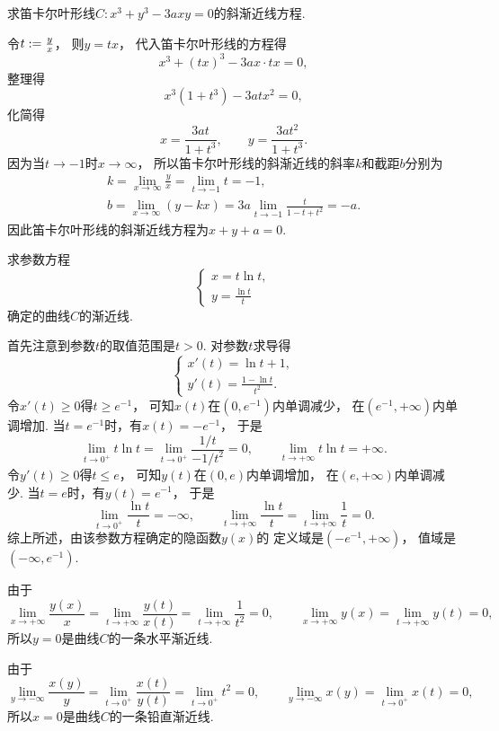 \begin{example}
求笛卡尔叶形线\(C: x^3+y^3-3axy=0\)的斜渐近线方程.
\begin{solution}
令\(t := \frac{y}{x}\)，
则\(y = tx\)，
代入笛卡尔叶形线的方程得\[
	x^3+(tx)^3-3ax \cdot tx = 0,
\]
整理得\[
	x^3(1+t^3)-3atx^2=0,
\]
化简得\[
	x = \frac{3at}{1+t^3},
	\qquad
	y = \frac{3at^2}{1+t^3}.
\]
因为当\(t\to-1\)时\(x\to\infty\)，
所以笛卡尔叶形线的斜渐近线的斜率\(k\)和截距\(b\)分别为\begin{gather*}
	k = \lim_{x\to\infty} \frac{y}{x}
	= \lim_{t\to-1} t
	= -1, \\
	b = \lim_{x\to\infty} (y-kx)
	= 3a \lim_{t\to-1} \frac{t}{1-t+t^2}
	= -a.
\end{gather*}
因此笛卡尔叶形线的斜渐近线方程为\(x+y+a=0\).
\end{solution}
\end{example}

\begin{example}
求参数方程\[
	\left\{ \begin{array}{l}
		x = t \ln t, \\
		y = \frac{\ln t}t
	\end{array} \right.
\]确定的曲线\(C\)的渐近线.
\begin{solution}
首先注意到参数\(t\)的取值范围是\(t>0\).
对参数\(t\)求导得\[
	\left\{ \begin{array}{l}
		x'(t) = \ln t + 1, \\
		y'(t) = \frac{1-\ln t}{t^2}.
	\end{array} \right.
\]
令\(x'(t) \geq 0\)得\(t \geq e^{-1}\)，
可知\(x(t)\)在\((0,e^{-1})\)内单调减少，
在\((e^{-1},+\infty)\)内单调增加.
当\(t = e^{-1}\)时，有\(x(t) = -e^{-1}\)，
于是\[
	\lim_{t\to0^+} t \ln t
	= \lim_{t\to0^+} \frac{1/t}{-1/t^2}
	= 0,
	\qquad
	\lim_{t\to+\infty} t \ln t
	= +\infty.
\]
令\(y'(t) \geq 0\)得\(t \leq e\)，
可知\(y(t)\)在\((0,e)\)内单调增加，
在\((e,+\infty)\)内单调减少.
当\(t = e\)时，有\(y(t) = e^{-1}\)，
于是\[
	\lim_{t\to0^+} \frac{\ln t}{t}
	= -\infty,
	\qquad
	\lim_{t\to+\infty} \frac{\ln t}{t}
	= \lim_{t\to+\infty} \frac1t
	= 0.
\]
综上所述，由该参数方程确定的隐函数\(y(x)\)的
定义域是\((-e^{-1},+\infty)\)，
值域是\((-\infty,e^{-1})\).

由于\[
	\lim_{x\to+\infty} \frac{y(x)}{x}
	= \lim_{t\to+\infty} \frac{y(t)}{x(t)}
	= \lim_{t\to+\infty} \frac1{t^2}
	= 0,
	\qquad
	\lim_{x\to+\infty} y(x)
	= \lim_{t\to+\infty} y(t)
	= 0,
\]
所以\(y=0\)是曲线\(C\)的一条水平渐近线.

由于\[
	\lim_{y\to-\infty} \frac{x(y)}{y}
	= \lim_{t\to0^+} \frac{x(t)}{y(t)}
	= \lim_{t\to0^+} t^2
	= 0,
	\qquad
	\lim_{y\to-\infty} x(y)
	= \lim_{t\to0^+} x(t)
	= 0,
\]
所以\(x=0\)是曲线\(C\)的一条铅直渐近线.
\end{solution}
\end{example}


